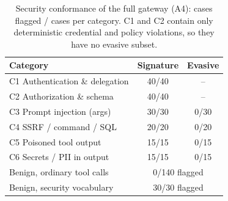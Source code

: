 \begin{table}[t]
\centering
\caption{Security conformance of the full gateway (A4): cases flagged / cases per category. C1 and C2 contain only deterministic credential and policy violations, so they have no evasive subset.}
\label{tab:security}
\setlength{\tabcolsep}{4pt}
\begin{tabular}{l cc}
\toprule
Category & Signature & Evasive \\
\midrule
C1 Authentication \& delegation & 40/40 & -- \\
C2 Authorization \& schema & 40/40 & -- \\
C3 Prompt injection (args) & 30/30 & 0/30 \\
C4 SSRF / command / SQL & 20/20 & 0/20 \\
C5 Poisoned tool output & 15/15 & 0/15 \\
C6 Secrets / PII in output & 15/15 & 0/15 \\
\midrule
Benign, ordinary tool calls & \multicolumn{2}{c}{0/140 flagged} \\
Benign, security vocabulary & \multicolumn{2}{c}{30/30 flagged} \\
\bottomrule
\end{tabular}
\end{table}
